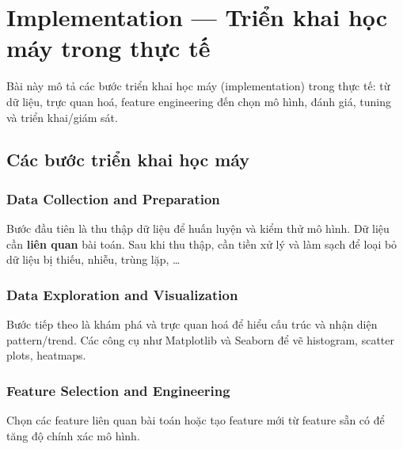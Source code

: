 \section{Implementation --- Triển khai học máy trong thực tế}

\begin{dongco}[title={target}]
Bài này mô tả các bước triển khai học máy (implementation) trong thực tế: từ dữ liệu, trực quan hoá, feature engineering đến chọn mô hình, đánh giá, tuning và triển khai/giám sát.
\end{dongco}

\subsection{Các bước triển khai học máy}

\subsubsection{Data Collection and Preparation}
\begin{phuongphap}[title={Thu thập và chuẩn bị dữ liệu}]
Bước đầu tiên là thu thập dữ liệu để huấn luyện và kiểm thử mô hình.
Dữ liệu cần \textbf{liên quan} bài toán.
Sau khi thu thập, cần tiền xử lý và làm sạch để loại bỏ dữ liệu bị thiếu, nhiễu, trùng lặp, \ldots
\end{phuongphap}

\subsubsection{Data Exploration and Visualization}
\begin{phuongphap}[title={Khám phá và trực quan hoá dữ liệu}]
Bước tiếp theo là khám phá và trực quan hoá để hiểu cấu trúc và nhận diện pattern/trend.
Các công cụ như Matplotlib và Seaborn để vẽ histogram, scatter plots, heatmaps.
\end{phuongphap}

\subsubsection{Feature Selection and Engineering}
\begin{phuongphap}[title={Chọn feature và tạo feature}]
Chọn các feature liên quan bài toán hoặc tạo feature mới từ feature sẵn có để tăng độ chính xác mô hình.
\end{phuongphap}

